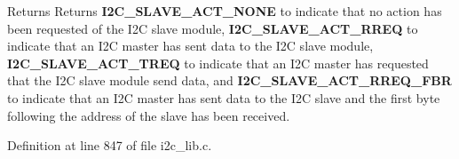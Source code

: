 \begin{DoxyReturn}{Returns}
Returns {\bfseries I2\+C\+\_\+\+S\+L\+A\+V\+E\+\_\+\+A\+C\+T\+\_\+\+N\+O\+NE} to indicate that no action has been requested of the I2C slave module, {\bfseries I2\+C\+\_\+\+S\+L\+A\+V\+E\+\_\+\+A\+C\+T\+\_\+\+R\+R\+EQ} to indicate that an I2C master has sent data to the I2C slave module, {\bfseries I2\+C\+\_\+\+S\+L\+A\+V\+E\+\_\+\+A\+C\+T\+\_\+\+T\+R\+EQ} to indicate that an I2C master has requested that the I2C slave module send data, and {\bfseries I2\+C\+\_\+\+S\+L\+A\+V\+E\+\_\+\+A\+C\+T\+\_\+\+R\+R\+E\+Q\+\_\+\+F\+BR} to indicate that an I2C master has sent data to the I2C slave and the first byte following the address of the slave has been received. 
\end{DoxyReturn}


Definition at line 847 of file i2c\+\_\+lib.\+c.

